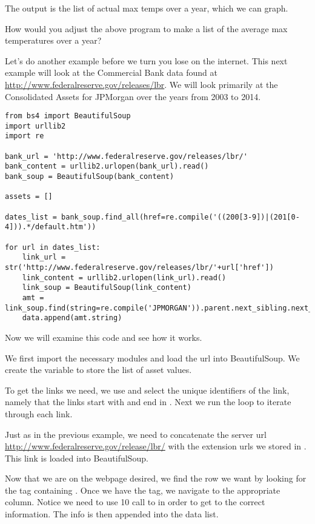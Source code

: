 The output is the list of actual max temps over a year, which we can graph.

\begin{problem}
How would you adjust the above program to make a list of the average max temperatures over a year?
\end{problem}

Let's do another example before we turn you lose on the internet.
This next example will look at the Commercial Bank data found at \url{http://www.federalreserve.gov/releases/lbr}.
We will look primarily at the Consolidated Assets for JPMorgan over the years from 2003 to 2014.

\begin{lstlisting}
from bs4 import BeautifulSoup
import urllib2
import re

bank_url = 'http://www.federalreserve.gov/releases/lbr/'
bank_content = urllib2.urlopen(bank_url).read()
bank_soup = BeautifulSoup(bank_content)

assets = []

dates_list = bank_soup.find_all(href=re.compile('((200[3-9])|(201[0-4])).*/default.htm'))

for url in dates_list:
    link_url = str('http://www.federalreserve.gov/releases/lbr/'+url['href'])
    link_content = urllib2.urlopen(link_url).read()
    link_soup = BeautifulSoup(link_content)
    amt = link_soup.find(string=re.compile('JPMORGAN')).parent.next_sibling.next_sibling.next_sibling.next_sibling.next_sibling.next_sibling.next_sibling.next_sibling.next_sibling.next_sibling
    data.append(amt.string)
\end{lstlisting}
Now we will examine this code and see how it works.

We first import the necessary modules and load the url into BeautifulSoup.
We create the variable  to store the list of asset values.

To get the links we need, we use  and select the unique identifiers of the link, namely that the links start with  and end in .
Next we run the  loop to iterate through each link.

Just as in the previous example, we need to concatenate the server url \url{http://www.federalreserve.gov/release/lbr/} with the extension urls we stored in .
This link is loaded into BeautifulSoup.

Now that we are on the webpage desired, we find the row we want by looking for the tag containing . Once we have the tag, we navigate to the appropriate column.
Notice we need to use 10 call to  in order to get to the correct information.
The info is then appended into the data list.

